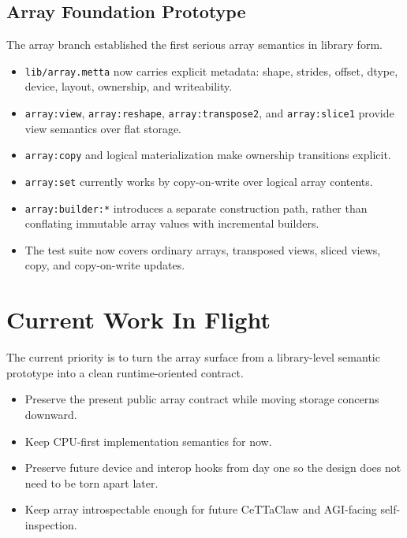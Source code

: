 \documentclass[11pt]{article}
\begin{document}
\subsection{Array Foundation Prototype}
The array branch established the first serious array semantics in library form.
\begin{itemize}
  \item \texttt{lib/array.metta} now carries explicit metadata: shape, strides, offset, dtype, device, layout, ownership, and writeability.
  \item \texttt{array:view}, \texttt{array:reshape}, \texttt{array:transpose2}, and \texttt{array:slice1} provide view semantics over flat storage.
  \item \texttt{array:copy} and logical materialization make ownership transitions explicit.
  \item \texttt{array:set} currently works by copy-on-write over logical array contents.
  \item \texttt{array:builder:*} introduces a separate construction path, rather than conflating immutable array values with incremental builders.
  \item The test suite now covers ordinary arrays, transposed views, sliced views, copy, and copy-on-write updates.
\end{itemize}

\section{Current Work In Flight}
The current priority is to turn the array surface from a library-level semantic prototype into a clean runtime-oriented contract.
\begin{itemize}
  \item Preserve the present public array contract while moving storage concerns downward.
  \item Keep CPU-first implementation semantics for now.
  \item Preserve future device and interop hooks from day one so the design does not need to be torn apart later.
  \item Keep array introspectable enough for future CeTTaClaw and AGI-facing self-inspection.
\end{itemize}
\end{document}
